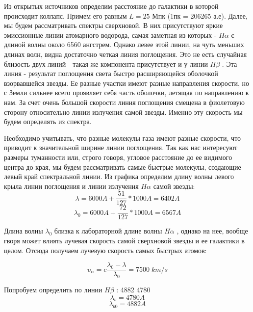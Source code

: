 \documentclass[a4paper, 12pt, openany]{book}
\begin{document}
	Из открытых источников определим расстояние до галактики в которой происходит коллапс. Примем его равным $L = 25 $ Мпк (1пк = 206265 а.е). Далее, мы будем рассматривать спектры сверхновой. В них присутствуют яркие эмиссионные линии атомарного водорода, самая заметная из которых - $H \alpha$ с длиной волны около 6560 ангстрем. Однако левее этой линии, на чуть меньших длинах волн, видна достаточно четкая линия поглощения. Это не есть случайная близость двух линий - такая же компонента присутствует и у линии $H \beta$ . Эта линия - результат поглощения света быстро расширяющейся оболочкой взорвавшейся звезды. Ее разные участки имеют разные направления скорости, но с Земли сильнее всего проявляет себя часть оболочки, летящая по направлению к нам. За счет очень большой скорости линия поглощения смещена в фиолетовую сторону относительно линии излучения самой звезды. Именно эту скорость мы будем определять из спектра.	
	
	\newpage
	
	Необходимо учитывать, что разные молекулы газа имеют разные скорости, что приводит к значительной ширине линии поглощения. Так как нас интересуют размеры туманности или, строго говоря, угловое расстояние до ее видимого центра до края, мы будем рассматривать самые быстрые молекулы, создающие левый край спектральной линии. Из графика определим длину волны левого крыла линии поглощения и линии излучения $H \alpha $ самой звезды:
	\begin{equation}
	\label{eq1}
	\lambda = 6000A + \dfrac{51}{127} * 1000A = 6402 A
	\end{equation}
	\begin{equation}
	\label{eq2}
	\lambda_{0} = 6000 A + \dfrac{72}{127} *1000A = 6567 A
	\end{equation}
	
	Длина волны $\lambda_{0}$ близка к лабораторной длине волны $H \alpha$ , однако на нее, вообще гворя может влиять лучевая скорость самой сверхновой звезды и ее галактики в целом. Отсюда получаем лучевую скорость самых быстрых атомов:
	
	\begin{equation}
	\label{eq3}
	\upsilon_{\alpha} = c \dfrac{\lambda_{0} - \lambda}{\lambda_{0}} =  7500 \; km/s
	\end{equation}
	
	Попробуем определить по линии $H \beta$ :
	4882  4780
	\begin{equation}
	\label{eq4}
	\lambda_{b} = 4780 A
	\end{equation}
	\begin{equation}
	\label{eq5}
	\lambda_{b0} = 4882 A
	\end{equation}
	
\end{document}
